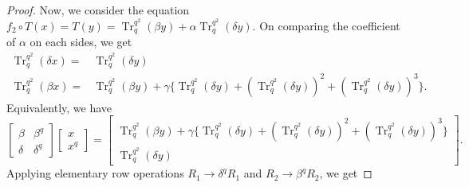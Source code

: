 \documentclass{birkjour}
\theoremstyle{definition}
\theoremstyle{remark}
\numberwithin{equation}{section}
\begin{document}
\begin{proof}
	Now, we consider the equation $f_2\circ T(x)=T(y)=\operatorname{Tr}_{q}^{q^2}(\beta y)+\alpha\operatorname{Tr}_{q}^{q^2}(\delta y)$.
	On comparing the coefficient of $\alpha$ on each sides, we get
	\begin{align*}
		\operatorname{Tr}_{q}^{q^2}(\delta x)=&\operatorname{Tr}_{q}^{q^2}(\delta y)\\
		\operatorname{Tr}_{q}^{q^2}(\beta x)=&\operatorname{Tr}_{q}^{q^2}(\beta y)+\gamma\{\operatorname{Tr}_{q}^{q^2}(\delta y)+(\operatorname{Tr}_{q}^{q^2}(\delta y))^2+(\operatorname{Tr}_{q}^{q^2}(\delta y))^3\}.
	\end{align*}
	Equivalently, we have
	$$\begin{bmatrix}
		\beta&\beta^{q}\\
		\delta&\delta^{q}
	\end{bmatrix}
	\begin{bmatrix}
		x\\x^{q}
	\end{bmatrix}=
	\begin{bmatrix}
		\operatorname{Tr}_{q}^{q^2}(\beta y)+\gamma\{\operatorname{Tr}_{q}^{q^2}(\delta y)+(\operatorname{Tr}_{q}^{q^2}(\delta y))^2+(\operatorname{Tr}_{q}^{q^2}(\delta y))^3\}\\
		\operatorname{Tr}_{q}^{q^2}(\delta y)
	\end{bmatrix}.$$
	Applying elementary row operations $R_1\rightarrow\delta^{q}R_1$ and $R_2\rightarrow\beta^{q}R_2$, we get
	

\end{proof}
\end{document}
